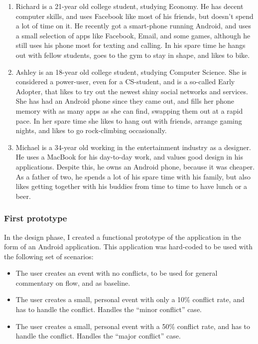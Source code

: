\documentclass[]{report}
\begin{document}
\begin{enumerate}
\item Richard is a 21-year old college student, studying Economy. He has decent
  computer skills, and uses Facebook like most of his friends, but doesn't spend
  a lot of time on it. He recently got a smart-phone running Android, and uses a
  small selection of apps like Facebook, Email, and some games, although he
  still uses his phone most for texting and calling. In his spare time he hangs
  out with fellow students, goes to the gym to stay in shape, and likes to bike.
\item Ashley is an 18-year old college student, studying Computer Science. She
  is considered a power-user, even for a CS-student, and is a so-called Early
  Adopter, that likes to try out the newest shiny social networks and
  services. She has had an Android phone since they came out, and fills her
  phone memory with as many apps as she can find, swapping them out at a rapid
  pace. In her spare time she likes to hang out with friends, arrange gaming
  nights, and likes to go rock-climbing occasionally.
\item Michael is a 34-year old working in the entertainment industry as a
  designer. He uses a MacBook for his day-to-day work, and values good design in
  his applications. Despite this, he owns an Android phone, because it was
  cheaper. As a father of two, he spends a lot of his spare time with his
  family, but also likes getting together with his buddies from time to time to
  have lunch or a beer.
\end{enumerate}

\subsubsection{First prototype}

In the design phase, I created a functional prototype of the application in the
form of an Android application. This application was hard-coded to be used with
the following set of scenarios:

\begin{itemize}
\item The user creates an event with no conflicts, to be used for general
  commentary on flow, and as baseline.
\item The user creates a small, personal event with only a 10\% conflict rate,
  and has to handle the conflict. Handles the ``minor conflict'' case.
\item The user creates a small, personal event with a 50\% conflict rate, and
  has to handle the conflict. Handles the ``major conflict'' case.
\end{itemize}
\end{document}

